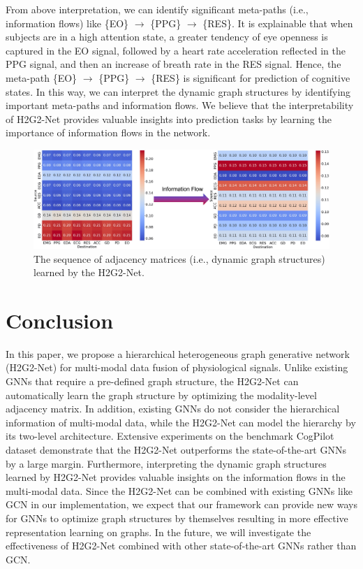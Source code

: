\documentclass[letterpaper]{article} %
\begin{document}
From above interpretation, we can identify significant meta-paths (i.e., information flows) like \{EO\} $\rightarrow$ \{PPG\} $\rightarrow$ \{RES\}. It is explainable that when subjects are in a high attention state, a greater tendency of eye openness is captured in the EO signal, followed by a heart rate acceleration reflected in the PPG signal, and then an increase of breath rate in the RES signal. Hence, the meta-path \{EO\} $\rightarrow$ \{PPG\} $\rightarrow$ \{RES\} is significant for prediction of cognitive states. In this way, we can interpret the dynamic graph structures by identifying important meta-paths and information flows. We believe that the interpretability of H2G2-Net provides valuable insights into prediction tasks by learning the importance of information flows in the network.

\begin{figure}[t]
    \centering
    \includegraphics[width=\columnwidth]{figures/Meta-path.jpg}
    \caption{The sequence of adjacency matrices (i.e., dynamic graph structures) learned by the H2G2-Net.}
    \label{fig_meta}
\end{figure}



\section{Conclusion}

In this paper, we propose a hierarchical heterogeneous graph generative network (H2G2-Net) for multi-modal data fusion of physiological signals. Unlike existing GNNs that require a pre-defined graph structure, the H2G2-Net can automatically learn the graph structure by optimizing the modality-level adjacency matrix. In addition, existing GNNs do not consider the hierarchical information of multi-modal data, while the H2G2-Net can model the hierarchy by its two-level architecture. Extensive experiments on the benchmark CogPilot dataset demonstrate that the H2G2-Net outperforms the state-of-the-art GNNs by a large margin. Furthermore, interpreting the dynamic graph structures learned by H2G2-Net provides valuable insights on the information flows in the multi-modal data. Since the H2G2-Net can be combined with existing GNNs like GCN in our implementation, we expect that our framework can provide new ways for GNNs to optimize graph structures by themselves resulting in more effective representation learning on graphs. In the future, we will investigate the effectiveness of H2G2-Net combined with other state-of-the-art GNNs rather than GCN.
\end{document}
